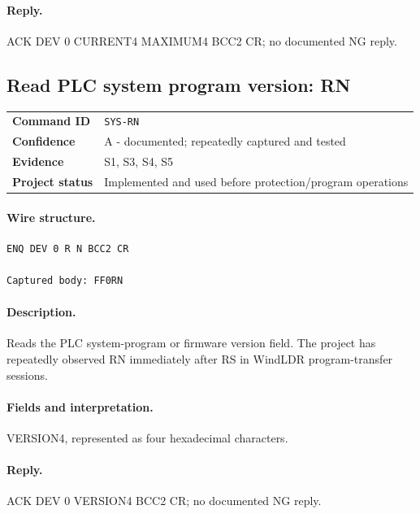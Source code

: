 \documentclass[10pt,letterpaper]{article}
\begin{document}
\paragraph{Reply.} ACK DEV 0 CURRENT4 MAXIMUM4 BCC2 CR; no documented NG reply.

\subsection{Read PLC system program version: RN}
\begin{tabularx}{\textwidth}{@{}>{\bfseries}p{2.8cm}X@{}}
Command ID & \texttt{SYS-RN} \\
Confidence & A - documented; repeatedly captured and tested \\
Evidence & S1, S3, S4, S5 \\
Project status & Implemented and used before protection/program operations \\
\end{tabularx}
\vspace{0.35em}
\paragraph{Wire structure.}
\begin{Verbatim}[breaklines=true,breakanywhere=true,fontsize=\small]
ENQ DEV 0 R N BCC2 CR

Captured body: FF0RN
\end{Verbatim}
\paragraph{Description.} Reads the PLC system-program or firmware version field. The project has repeatedly observed RN immediately after RS in WindLDR program-transfer sessions.
\paragraph{Fields and interpretation.}
\begin{description}[style=nextline,leftmargin=3.2cm,labelwidth=3.0cm,font=\normalfont\bfseries]
\item[Reply data] VERSION4, represented as four hexadecimal characters.
\end{description}
\paragraph{Reply.} ACK DEV 0 VERSION4 BCC2 CR; no documented NG reply.
\end{document}
